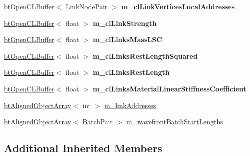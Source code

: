 \begin{DoxyCompactItemize}
\hyperlink{classbtOpenCLBuffer}{bt\+Open\+C\+L\+Buffer}$<$ \hyperlink{classbtSoftBodyLinkData_1_1LinkNodePair}{Link\+Node\+Pair} $>$ {\bfseries m\+\_\+cl\+Link\+Vertices\+Local\+Addresses}
\item 
\mbox{\label{classbtSoftBodyLinkDataOpenCLSIMDAware_a0c2413c3bede418582a03af857220653}} 
\hyperlink{classbtOpenCLBuffer}{bt\+Open\+C\+L\+Buffer}$<$ float $>$ {\bfseries m\+\_\+cl\+Link\+Strength}
\item 
\mbox{\label{classbtSoftBodyLinkDataOpenCLSIMDAware_a467151798d841225f0935c72ce2888e4}} 
\hyperlink{classbtOpenCLBuffer}{bt\+Open\+C\+L\+Buffer}$<$ float $>$ {\bfseries m\+\_\+cl\+Links\+Mass\+L\+SC}
\item 
\mbox{\label{classbtSoftBodyLinkDataOpenCLSIMDAware_aa7e887ee90296314748c010268a78b4f}} 
\hyperlink{classbtOpenCLBuffer}{bt\+Open\+C\+L\+Buffer}$<$ float $>$ {\bfseries m\+\_\+cl\+Links\+Rest\+Length\+Squared}
\item 
\mbox{\label{classbtSoftBodyLinkDataOpenCLSIMDAware_a23661a0173894340a9ce33c7628322f4}} 
\hyperlink{classbtOpenCLBuffer}{bt\+Open\+C\+L\+Buffer}$<$ float $>$ {\bfseries m\+\_\+cl\+Links\+Rest\+Length}
\item 
\mbox{\label{classbtSoftBodyLinkDataOpenCLSIMDAware_a4c6c66bfca09087ec9003572fead458a}} 
\hyperlink{classbtOpenCLBuffer}{bt\+Open\+C\+L\+Buffer}$<$ float $>$ {\bfseries m\+\_\+cl\+Links\+Material\+Linear\+Stiffness\+Coefficient}
\item 
\hyperlink{classbtAlignedObjectArray}{bt\+Aligned\+Object\+Array}$<$ int $>$ \hyperlink{classbtSoftBodyLinkDataOpenCLSIMDAware_a9e083b3c7dc8384ddbd073bff540a406}{m\+\_\+link\+Addresses}
\item 
\hyperlink{classbtAlignedObjectArray}{bt\+Aligned\+Object\+Array}$<$ \hyperlink{structbtSoftBodyLinkDataOpenCLSIMDAware_1_1BatchPair}{Batch\+Pair} $>$ \hyperlink{classbtSoftBodyLinkDataOpenCLSIMDAware_a4c49f65f43a5eca3408ae17c0b3340c3}{m\+\_\+wavefront\+Batch\+Start\+Lengths}
\end{DoxyCompactItemize}
\subsection*{Additional Inherited Members}


